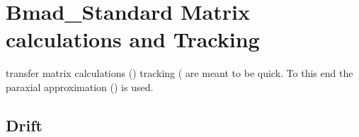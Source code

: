 \section{Bmad\_Standard Matrix calculations and Tracking}
\label{s:bmad_standard}
\index{} 

 transfer matrix calculations () tracking ( are meant to be quick. To this end the paraxial approximation () is used. 

\subsection{Drift}

